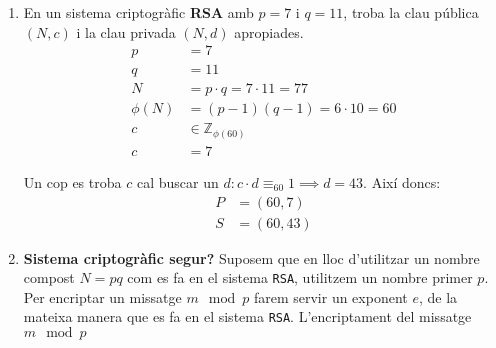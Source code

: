 \documentclass[a4paper]{article}
\begin{document}
\begin{enumerate}
\item En un sistema criptogràfic \textbf{RSA} amb $p = 7$ i $q = 11$, troba la clau pública $(N, c)$ i la clau privada $(N, d)$ apropiades.
\begin{align*}
	p &= 7 \\
	q &= 11 \\
	N &= p \cdot q = 7 \cdot 11 = 77 \\
	\phi(N) &= (p - 1)(q - 1) = 6 \cdot 10 = 60 \\
	c &\in \mathbb{Z}_{\phi(60)} \\
	c &= 7
\end{align*}

Un cop es troba $c$ cal buscar un $d : c \cdot d \equiv_{60} 1 \implies d = 43$. Així doncs:
\begin{align*}
	P &= (60, 7) \\
	S &= (60, 43)
\end{align*}

\item \textbf{Sistema criptogràfic segur?} Suposem que en lloc d'utilitzar un nombre compost $N = pq$ com es fa en el sistema \texttt{RSA}, utilitzem un nombre primer $p$. Per encriptar un missatge $m \mod p$ farem servir un exponent $e$, de la mateixa manera que es fa en el sistema \texttt{RSA}. L'encriptament del missatge $m \mod p$ 

\end{enumerate}
\end{document}

